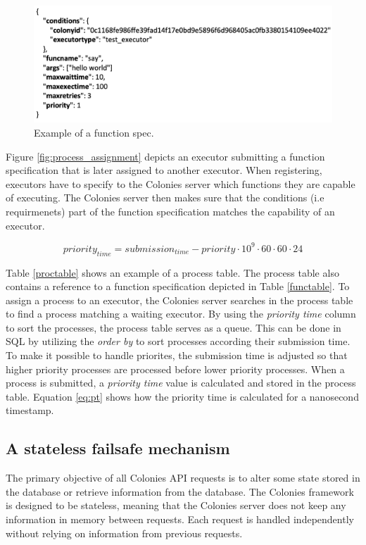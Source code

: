\documentclass{article}
\begin{document}
\begin{figure}[h]
	\centering
    \includegraphics[scale=0.35]{function_spec.png}
	\caption{Example of a function spec.}
	\label{fig:function_spec}
\end{figure}

Figure \ref{fig:process_assignment} depicts an executor submitting a function specification that is later assigned to another executor. When registering, executors have to specify to the Colonies server which functions they are capable of executing. The Colonies server then makes sure that the conditions (i.e requirmenets) part of the function specification matches the capability of an executor. 

\begin{equation}
    \label{eq:pt}
    priority_{time}=submission_{time} - priority \cdot 10^9 \cdot 60 \cdot 60 \cdot 24
\end{equation}

Table \ref{proctable} shows an example of a process table. The process table also contains a reference to a function specification depicted in Table \ref{functable}. To assign a process to an executor, the Colonies server searches in the process table to find a process matching a waiting executor. By using the \emph{priority time} column to sort the processes, the process table serves as a queue. This can be done in SQL by utilizing the \emph{order by} to sort processes according their submission time. To make it possible to handle priorites, the submission time is adjusted so that higher priority processes are processed before lower priority processes. When a process is submitted, a \emph{priority time} value is calculated and stored in the process table. Equation \ref{eq:pt} shows how the priority time is calculated for a nanosecond timestamp. 

\subsection{A stateless failsafe mechanism}
The primary objective of all Colonies API requests is to alter some state stored in the database or retrieve information from the database. The Colonies framework is designed to be stateless, meaning that the Colonies server does not keep any information in memory between requests. Each request is handled independently without relying on information from previous requests. 
\end{document}

